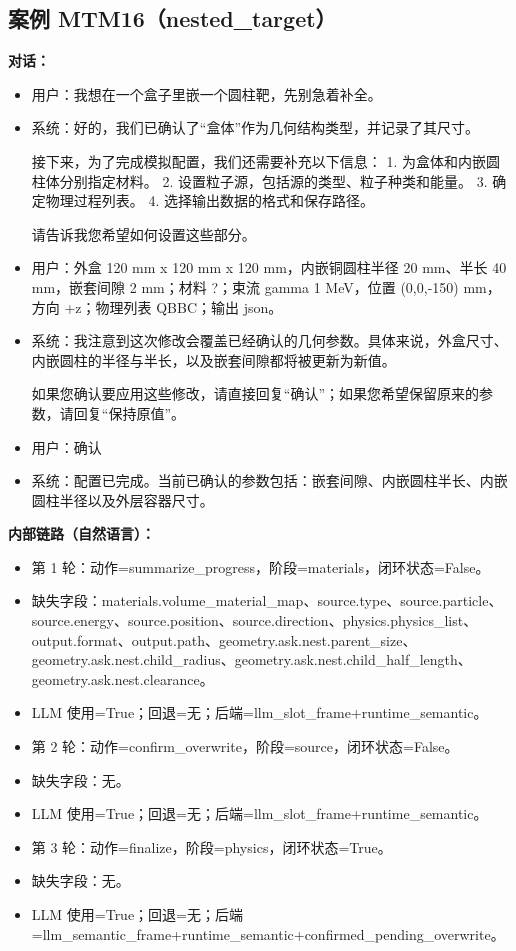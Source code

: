 \documentclass[11pt]{ctexart}
\begin{document}
\subsection{案例 MTM16（nested\_target）}
\textbf{对话：}
\begin{itemize}
\item 用户：我想在一个盒子里嵌一个圆柱靶，先别急着补全。
\item 系统：好的，我们已确认了“盒体”作为几何结构类型，并记录了其尺寸。

接下来，为了完成模拟配置，我们还需要补充以下信息：
1.  为盒体和内嵌圆柱体分别指定材料。
2.  设置粒子源，包括源的类型、粒子种类和能量。
3.  确定物理过程列表。
4.  选择输出数据的格式和保存路径。

请告诉我您希望如何设置这些部分。
\item 用户：外盒 120 mm x 120 mm x 120 mm，内嵌铜圆柱半径 20 mm、半长 40 mm，嵌套间隙 2 mm；材料 ?；束流 gamma 1 MeV，位置 (0,0,-150) mm，方向 +z；物理列表 QBBC；输出 json。
\item 系统：我注意到这次修改会覆盖已经确认的几何参数。具体来说，外盒尺寸、内嵌圆柱的半径与半长，以及嵌套间隙都将被更新为新值。

如果您确认要应用这些修改，请直接回复“确认”；如果您希望保留原来的参数，请回复“保持原值”。
\item 用户：确认
\item 系统：配置已完成。当前已确认的参数包括：嵌套间隙、内嵌圆柱半长、内嵌圆柱半径以及外层容器尺寸。
\end{itemize}
\textbf{内部链路（自然语言）：}
\begin{itemize}
\item 第 1 轮：动作=summarize\_progress，阶段=materials，闭环状态=False。
\item 缺失字段：materials.volume\_material\_map、source.type、source.particle、source.energy、source.position、source.direction、physics.physics\_list、output.format、output.path、geometry.ask.nest.parent\_size、geometry.ask.nest.child\_radius、geometry.ask.nest.child\_half\_length、geometry.ask.nest.clearance。
\item LLM 使用=True；回退=无；后端=llm\_slot\_frame+runtime\_semantic。
\item 第 2 轮：动作=confirm\_overwrite，阶段=source，闭环状态=False。
\item 缺失字段：无。
\item LLM 使用=True；回退=无；后端=llm\_slot\_frame+runtime\_semantic。
\item 第 3 轮：动作=finalize，阶段=physics，闭环状态=True。
\item 缺失字段：无。
\item LLM 使用=True；回退=无；后端=llm\_semantic\_frame+runtime\_semantic+confirmed\_pending\_overwrite。
\end{itemize}
\end{document}
